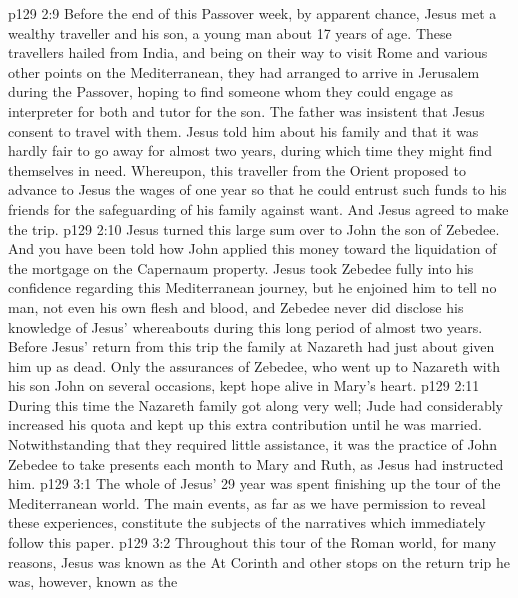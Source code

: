 \vs p129 2:9 \pc Before the end of this Passover week, by apparent chance, Jesus met a wealthy traveller and his son, a young man about 17 years of age. These travellers hailed from India, and being on their way to visit Rome and various other points on the Mediterranean, they had arranged to arrive in Jerusalem during the Passover, hoping to find someone whom they could engage as interpreter for both and tutor for the son. The father was insistent that Jesus consent to travel with them. Jesus told him about his family and that it was hardly fair to go away for almost two years, during which time they might find themselves in need. Whereupon, this traveller from the Orient proposed to advance to Jesus the wages of one year so that he could entrust such funds to his friends for the safeguarding of his family against want. And Jesus agreed to make the trip.
\vs p129 2:10 Jesus turned this large sum over to John the son of Zebedee. And you have been told how John applied this money toward the liquidation of the mortgage on the Capernaum property. Jesus took Zebedee fully into his confidence regarding this Mediterranean journey, but he enjoined him to tell no man, not even his own flesh and blood, and Zebedee never did disclose his knowledge of Jesus’ whereabouts during this long period of almost two years. Before Jesus’ return from this trip the family at Nazareth had just about given him up as dead. Only the assurances of Zebedee, who went up to Nazareth with his son John on several occasions, kept hope alive in Mary’s heart.
\vs p129 2:11 \pc During this time the Nazareth family got along very well; Jude had considerably increased his quota and kept up this extra contribution until he was married. Notwithstanding that they required little assistance, it was the practice of John Zebedee to take presents each month to Mary and Ruth, as Jesus had instructed him.
\vs p129 3:1 The whole of Jesus’ 29 year was spent finishing up the tour of the Mediterranean world. The main events, as far as we have permission to reveal these experiences, constitute the subjects of the narratives which immediately follow this paper.
\vs p129 3:2 \pc Throughout this tour of the Roman world, for many reasons, Jesus was known as the  At Corinth and other stops on the return trip he was, however, known as the 

